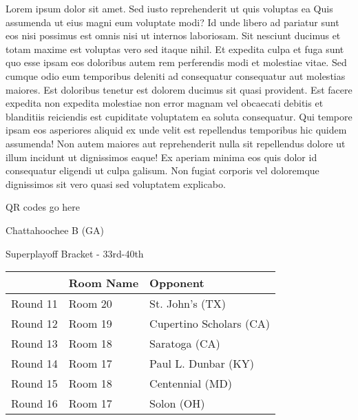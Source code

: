 \documentclass{article}%
\begin{document}
\vspace*{8pt}%
\linebreak%
\newline%
\newline%
    Lorem ipsum dolor sit amet. Sed iusto reprehenderit ut quis voluptas ea Quis assumenda ut eius magni eum voluptate modi? Id unde libero ad pariatur sunt eos nisi possimus est omnis nisi ut internos laboriosam. Sit nesciunt ducimus et totam maxime est voluptas vero sed itaque nihil. Et expedita culpa et fuga sunt quo esse ipsam eos doloribus autem rem perferendis modi et molestiae vitae.\newline%
\newline%
    Sed cumque odio eum temporibus deleniti ad consequatur consequatur aut molestias maiores. Est doloribus tenetur est dolorem ducimus sit quasi provident. Est facere expedita non expedita molestiae non error magnam vel obcaecati debitis et blanditiis reiciendis est cupiditate voluptatem ea soluta consequatur. Qui tempore ipsam eos asperiores aliquid ex unde velit est repellendus temporibus hic quidem assumenda!\newline%
\newline%
    Non autem maiores aut reprehenderit nulla sit repellendus dolore ut illum incidunt ut dignissimos eaque! Ex aperiam minima eos quis dolor id consequatur eligendi ut culpa galisum. Non fugiat corporis vel doloremque dignissimos sit vero quasi sed voluptatem explicabo.\newline%
\newline%
\vspace*{30pt}%
\begin{center}%
\begin{Huge}%
QR codes go here%
\end{Huge}%
\end{center}%
\newpage%
\begin{center}%
\begin{Huge}%
Chattahoochee B (GA)%
\end{Huge}%
\vspace*{8pt}%
\linebreak%
\begin{Large}%
Superplayoff Bracket {-} 33rd{-}40th%
\end{Large}%
\end{center}%
%
\begin{tabularx}{\textwidth}{|c|Y|Y|}%
\hline%
&Room Name&Opponent\\%
\hline%
Round 11&Room 20&St. John's (TX)\\%
Round 12&Room 19&Cupertino Scholars (CA)\\%
Round 13&Room 18&Saratoga (CA)\\%
Round 14&Room 17&Paul L. Dunbar (KY)\\%
Round 15&Room 18&Centennial (MD)\\%
Round 16&Room 17&Solon (OH)\\%
\hline%
\end{tabularx}%
\end{document}

